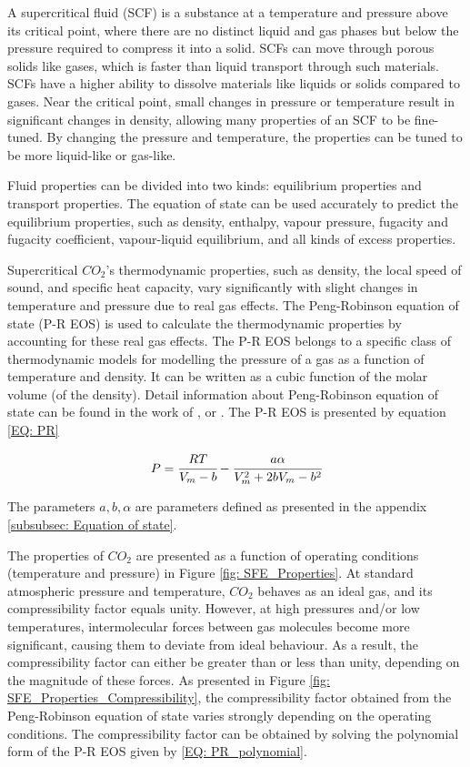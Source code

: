 \documentclass[../Article_Model_Parameters.tex]{subfiles}
\begin{document}
	
	A supercritical fluid (SCF) is a substance at a temperature and pressure above its critical point, where there are no distinct liquid and gas phases but below the pressure required to compress it into a solid. SCFs can move through porous solids like gases, which is faster than liquid transport through such materials. SCFs have a higher ability to dissolve materials like liquids or solids compared to gases. Near the critical point, small changes in pressure or temperature result in significant changes in density, allowing many properties of an SCF to be fine-tuned. By changing the pressure and temperature, the properties can be tuned to be more liquid-like or gas-like.
	
	Fluid properties can be divided into two kinds: equilibrium properties and transport properties. The equation of state can be used accurately to predict the equilibrium properties, such as density, enthalpy, vapour pressure, fugacity and fugacity coefficient, vapour-liquid equilibrium, and all kinds of excess properties.
	
	Supercritical $CO_2$'s thermodynamic properties, such as density, the local speed of sound, and specific heat capacity, vary significantly with slight changes in temperature and pressure due to real gas effects. The Peng-Robinson equation of state (P-R EOS) is used to calculate the thermodynamic properties by accounting for these real gas effects. The P-R EOS belongs to a specific class of thermodynamic models for modelling the pressure of a gas as a function of temperature and density. It can be written as a cubic function of the molar volume (of the density). Detail information about Peng-Robinson equation of state can be found in the work of \citet{Peng1976}, \citet{Elliott2011} or \citet{Pratt2001}. The P-R EOS is presented by equation \ref{EQ: PR}
	
	{\footnotesize
		\begin{equation}
			P = \cfrac{RT}{V_m - b} - \cfrac{a\alpha}{V_m^2 + 2bV_m - b^2}
			\label{EQ: PR}
		\end{equation}
	}
	
	The parameters $a, b, \alpha$ are parameters defined as presented in the appendix \ref{subsubsec: Equation of state}.
	
	The properties of $CO_2$  are presented as a function of operating conditions (temperature and pressure) in Figure \ref{fig: SFE_Properties}. At standard atmospheric pressure and temperature, $CO_2$  behaves as an ideal gas, and its compressibility factor equals unity. However, at high pressures and/or low temperatures, intermolecular forces between gas molecules become more significant, causing them to deviate from ideal behaviour. As a result, the compressibility factor can either be greater than or less than unity, depending on the magnitude of these forces. As presented in Figure \ref{fig: SFE_Properties_Compressibility}, the compressibility factor obtained from the Peng-Robinson equation of state varies strongly depending on the operating conditions. The compressibility factor can be obtained by solving the polynomial form of the P-R EOS given by \ref{EQ: PR_polynomial}.
	
\end{document}
